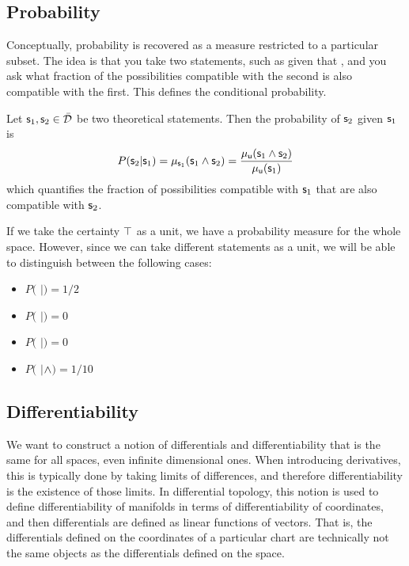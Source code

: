 \documentclass[11pt,letterpaper,fleqn]{memoir} %
\begin{document}
\subsection{Probability}

Conceptually, probability is recovered as a measure restricted to a particular subset. The idea is that you take two statements, such as  given that , and you ask what fraction of the possibilities compatible with the second is also compatible with the first. This defines the conditional probability.

Let $\stmt_1, \stmt_2 \in \tdomain$ be two theoretical statements. Then the probability of $\stmt_2$ given $\stmt_1$ is
\begin{equation}
	P(\stmt_2 | \stmt_1) = \mu_{\stmt_1}(\stmt_1 \AND \stmt_2) = \frac{\mu_{\stmt[u]}(\stmt_1 \AND \stmt_2)}{\mu_{\stmt[u]}(\stmt_1)}
\end{equation}
which quantifies the fraction of possibilities compatible with $\stmt_1$ that are also compatible with $\stmt_2$.

If we take the certainty $\certainty$ as a unit, we have a probability measure for the whole space. However, since we can take different statements as a unit, we will be able to distinguish between the following cases:
\begin{itemize}
	\item $P($ $|$$)=1/2$
	\item $P($ $|$$)=0$
	\item $P($ $|$$)=0$
	\item $P($ $|$$\AND$$)=1/10$
\end{itemize}

\subsection{Differentiability}

We want to construct a notion of differentials and differentiability that is the same for all spaces, even infinite dimensional ones. When introducing derivatives, this is typically done by taking limits of differences, and therefore differentiability is the existence of those limits. In differential topology, this notion is used to define differentiability of manifolds in terms of differentiability of coordinates, and then differentials are defined as linear functions of vectors. That is, the differentials defined on the coordinates of a particular chart are technically not the same objects as the differentials defined on the space.
\end{document}

